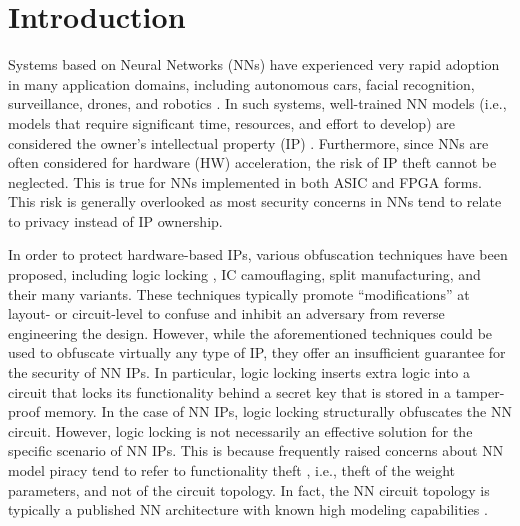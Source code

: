 \documentclass[10pt, twocolumn, conference]{IEEEtran}
\begin{document}
\section{Introduction} \label{sec:intro}
Systems based on Neural Networks (NNs) have experienced very rapid adoption in many application domains, including autonomous cars, facial recognition, surveillance, drones, and robotics \cite{rfHwAssDate,NN_app_2}. %
In such systems, well-trained NN models (i.e., models that require significant time, resources, and effort to develop) are considered the owner's intellectual property (IP) \cite{rfHwAssDate}. Furthermore, since NNs are often considered for hardware (HW) acceleration, the risk of IP theft cannot be neglected. This is true for NNs implemented in both ASIC and FPGA forms. This risk is generally overlooked as most security concerns in NNs tend to relate to privacy \cite{zhang2015privacy} instead of IP ownership.


In order to protect hardware-based IPs, various obfuscation techniques have been proposed, including logic locking \cite{obs1}, IC camouflaging, split manufacturing, and their many variants. These techniques typically promote ``modifications'' at layout- or circuit-level to confuse and inhibit an adversary from reverse engineering the design. However, while the aforementioned techniques could be used to obfuscate virtually any type of IP, they offer an insufficient guarantee for the security of NN IPs. In particular, logic locking inserts extra logic into a circuit that locks its functionality behind a secret key that is stored in a tamper-proof memory. In the case of NN IPs, logic locking structurally obfuscates the NN circuit. However, logic locking is not necessarily an effective solution for the specific scenario of NN IPs. This is because frequently raised concerns about NN model piracy tend to refer to functionality theft \cite{rfdeepobfuscation}, i.e., theft of the weight parameters, and not of the circuit topology. In fact, the NN circuit topology is typically a published NN architecture with known high modeling capabilities \cite{rfHwAssDate}.
\end{document}
